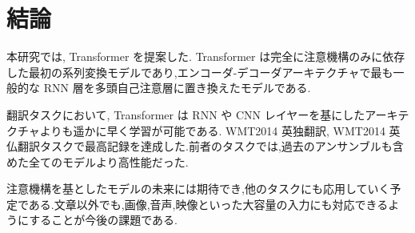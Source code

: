 \documentclass{jarticle}     %
\begin{document}
\section{結論}
本研究では, Transformer を提案した. Transformer は完全に注意機構のみに依存した最初の系列変換モデルであり,エンコーダ-デコーダアーキテクチャで最も一般的な RNN 層を多頭自己注意層に置き換えたモデルである.\par
翻訳タスクにおいて, Transformer は RNN や CNN レイヤーを基にしたアーキテクチャよりも遥かに早く学習が可能である. WMT2014 英独翻訳, WMT2014 英仏翻訳タスクで最高記録を達成した.前者のタスクでは,過去のアンサンブルも含めた全てのモデルより高性能だった.\par
注意機構を基としたモデルの未来には期待でき,他のタスクにも応用していく予定である.文章以外でも,画像,音声,映像といった大容量の入力にも対応できるようにすることが今後の課題である.




\end{document}
